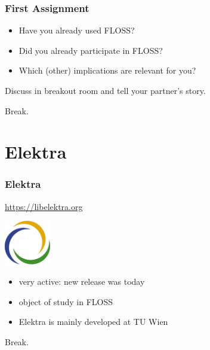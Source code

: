 \begin{assignment}
	\frametitle{First Assignment}
	\begin{itemize}[<+-| alert@+>]
		\item Have you already used FLOSS?
		\item Did you already participate in FLOSS?
		\item Which (other) implications are relevant for you?
	\end{itemize}
	\pause[\thebeamerpauses]

	\begin{task}
	Discuss in breakout room and tell your partner's story.
	\end{task}
\end{assignment}

\begin{assignment}
	\begin{task}
	Break.
	\end{task}
\end{assignment}

\section{Elektra}

\begin{frame}
	\frametitle{Elektra}

	\url{https://libelektra.org}

	\hfill \includegraphics[width=2cm]{../figures/logo}

	\vspace{-1cm}
	\begin{itemize}[<+-| alert@+>]
		\item very active: new release was today
		\item object of study in FLOSS
		\item Elektra is mainly developed at TU Wien
	\end{itemize}
\end{frame}

\begin{assignment}
	\begin{task}
	Break.
	\end{task}
\end{assignment}

